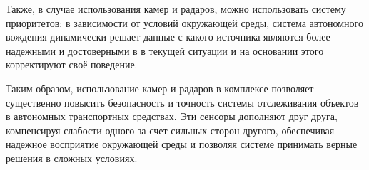 Также, в случае использования камер и радаров, можно использовать систему приоритетов:
в зависимости от условий окружающей среды, система автономного вождения динамически 
решает данные с какого источника являются более надежными и достоверными в в текущей 
ситуации и на основании этого корректируют своё поведение.

Таким образом, использование камер и радаров в комплексе позволяет существенно повысить безопасность и точность системы отслеживания объектов в автономных транспортных средствах. Эти сенсоры дополняют друг друга, компенсируя слабости одного за счет сильных сторон другого, обеспечивая надежное восприятие окружающей среды и позволяя системе принимать верные решения в сложных условиях.

